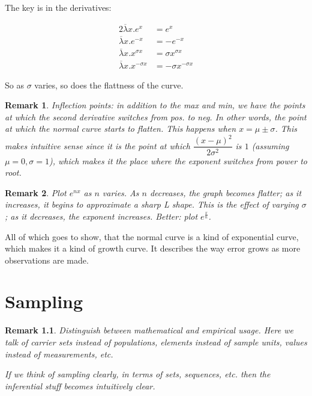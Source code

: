 \documentclass[reqno,12pt]{tufte-book}
\numberwithin{equation}{subsection}
\newtheorem{remark}{Remark}
\begin{document}
The key is in the derivatives:

{
  \begin{alignat}{2}
  \overline{\lambda}x.{e^{x}} &= e^{x} \\
  \overline{\lambda}x.{e^{-x}} &= -e^{-x} \\
  \overline{\lambda}x.x^{\sigma x} &= \sigma x^{\sigma x} \\
  \overline{\lambda}x.x^{-\sigma x} &= -\sigma x^{-\sigma x}
  \end{alignat}
}

So as $\sigma$ varies, so does the flattness of the curve.

\begin{remark}
  Inflection points: in addition to the max and min, we have the
  points at which the second derivative switches from pos. to neg.  In
  other words, the point at which the normal curve starts to flatten.
  This happens when $x=\mu\pm\sigma$.  This makes intuitive sense
  since it is the point at which $\dfrac{(x-\mu)^2}{2\sigma^2}$ is $1$
  (assuming $\mu=0, \sigma=1$), which makes it the place where the
  exponent switches from power to root.
\end{remark}

\begin{remark}
  Plot $e^{nx}$ as $n$ varies.  As $n$ decreases, the graph becomes
  flatter; as it increases, it begins to approximate a sharp L shape.
  This is the effect of varying $\sigma$; as it decreases, the
  exponent increases.  Better: plot $e^{\frac{x}{n}}$.
\end{remark}

All of which goes to show, that the normal curve is a kind of
exponential curve, which makes it a kind of growth curve.  It
describes the way error grows as more observations are made.


\chapter{Sampling}

\begin{remark}
  Distinguish between mathematical and empirical usage.  Here we talk
  of carrier sets instead of populations, elements instead of sample
  units, values instead of measurements, etc.

  If we think of sampling clearly, in terms of sets, sequences,
  etc. then the inferential stuff becomes intuitively clear.
\end{remark}
\end{document}
